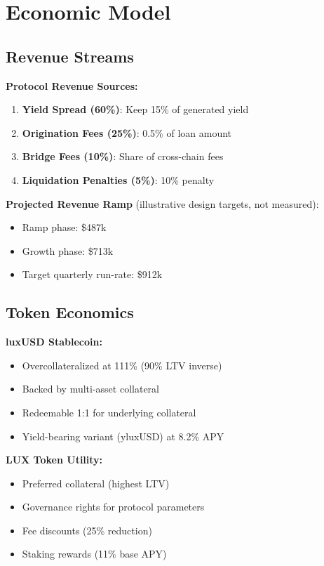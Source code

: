 \section{Economic Model}


\subsection{Revenue Streams}

\textbf{Protocol Revenue Sources:}
\begin{enumerate}
\item \textbf{Yield Spread (60\%)}: Keep 15\% of generated yield
\item \textbf{Origination Fees (25\%)}: 0.5\% of loan amount
\item \textbf{Bridge Fees (10\%)}: Share of cross-chain fees
\item \textbf{Liquidation Penalties (5\%)}: 10\% penalty
\end{enumerate}

\textbf{Projected Revenue Ramp} (illustrative design targets, not measured):
\begin{itemize}
\item Ramp phase: \$487k
\item Growth phase: \$713k
\item Target quarterly run-rate: \$912k
\end{itemize}

\subsection{Token Economics}

\textbf{luxUSD Stablecoin:}
\begin{itemize}
\item Overcollateralized at 111\% (90\% LTV inverse)
\item Backed by multi-asset collateral
\item Redeemable 1:1 for underlying collateral
\item Yield-bearing variant (yluxUSD) at 8.2\% APY
\end{itemize}

\textbf{LUX Token Utility:}
\begin{itemize}
\item Preferred collateral (highest LTV)
\item Governance rights for protocol parameters
\item Fee discounts (25\% reduction)
\item Staking rewards (11\% base APY)
\end{itemize}

